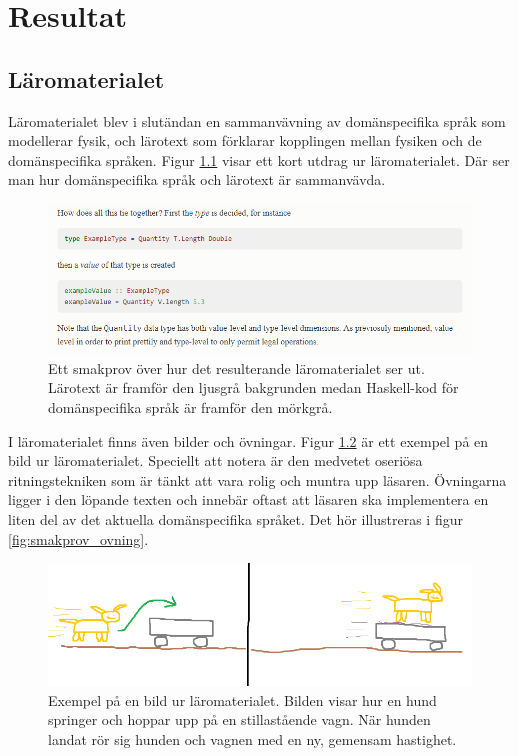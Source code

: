 
\chapter{Resultat}

\begin{binge}

\section{Läromaterialet}

Läromaterialet blev i slutändan en sammanvävning av domänspecifika språk som modellerar fysik, och lärotext som förklarar kopplingen mellan fysiken och de domänspecifika språken. Figur \ref{fig:smakprov_laromaterial} visar ett kort utdrag ur läromaterialet. Där ser man hur domänspecifika språk och lärotext är sammanvävda.

\begin{figure}[tph]
  \includegraphics[width=\linewidth]{figure/smakprov_laromaterial.png}
  \caption{Ett smakprov över hur det resulterande läromaterialet ser ut. Lärotext är framför den ljusgrå bakgrunden medan Haskell-kod för domänspecifika språk är framför den mörkgrå.}
  \label{fig:smakprov_laromaterial}
\end{figure}

I läromaterialet finns även bilder och övningar. Figur \ref{fig:smakprov_bild_laromaterial} är ett exempel på en bild ur läromaterialet. Speciellt att notera är den medvetet oseriösa ritningstekniken som är tänkt att vara rolig och muntra upp läsaren. Övningarna ligger i den löpande texten och innebär oftast att läsaren ska implementera en liten del av det aktuella domänspecifika språket. Det hör illustreras i figur \ref{fig:smakprov_ovning}.

\begin{figure}[tph]
  \includegraphics[width=\linewidth]{figure/smakprov_bild_laromaterial.png}
  \caption{Exempel på en bild ur läromaterialet. Bilden visar hur en hund springer och hoppar upp på en stillastående vagn. När hunden landat rör sig hunden och vagnen med en ny, gemensam hastighet.}
  \label{fig:smakprov_bild_laromaterial}
\end{figure}


\end{binge}
